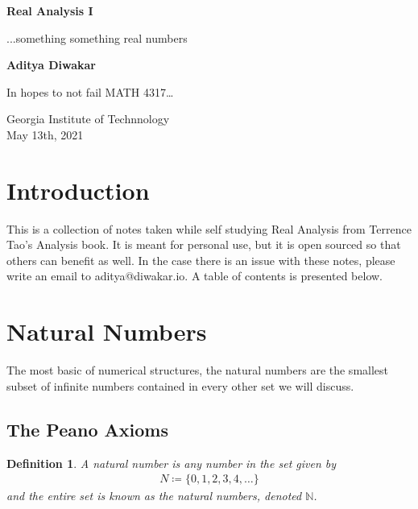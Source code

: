 \documentclass[14pt]{extarticle}
\newtheorem{definition}{Definition}[subsection]
\begin{document}
\begin{titlepage}
   \begin{center}
       \vspace*{1cm}

       \textbf{\LARGE Real Analysis I}

       \vspace{0.5cm}

       {\Large ...something something real numbers}
            
       \vspace{1.5cm}

       \textbf{\Large Aditya Diwakar}

       \vfill
            
       \large{In hopes to not fail MATH 4317\dots
            
       \vspace{0.8cm}
     
       Georgia Institute of Technnology\\
       May 13th, 2021}
            
   \end{center}
\end{titlepage}

\section{Introduction}
This is a collection of notes taken while self studying Real Analysis from Terrence Tao's Analysis book.
It is meant for personal use, but it is open sourced so that others can benefit as well. In the case
there is an issue with these notes, please write an email to aditya@diwakar.io. A table of contents is
presented below.

\tableofcontents
\pagebreak
\setcounter{tocdepth}{3}

\section{Natural Numbers}
\localtableofcontents

\vspace{0.5cm}

\noindent
The most basic of numerical structures, the natural numbers are the smallest subset of infinite numbers
contained in every other set we will discuss.

\subsection{The Peano Axioms}
\begin{definition}
    A natural number is any number in the set given by
    \begin{align*}
        N \coloneqq \{0, 1, 2, 3, 4, \dots\}
    \end{align*}
    and the entire set is known as the natural numbers, denoted $\mathbb{N}$.
\end{definition}
\end{document}
